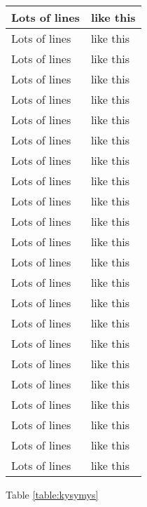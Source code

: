 \begin{longtable}[l]{| p{40mm} | p{105mm} |}
    \hline
    Lots of lines & like this\\
    \hline
    Lots of lines & like this\\
    \hline
    Lots of lines & like this\\
    \hline
    Lots of lines & like this\\
    \hline
    Lots of lines & like this\\
    \hline
    Lots of lines & like this\\
    \hline
    Lots of lines & like this\\
    \hline
    Lots of lines & like this\\
    \hline
    Lots of lines & like this\\
    \hline
    Lots of lines & like this\\
    \hline
    Lots of lines & like this\\
    \hline
    Lots of lines & like this\\
    \hline
    Lots of lines & like this\\
    \hline
    Lots of lines & like this\\
    \hline
    Lots of lines & like this\\
    \hline
    Lots of lines & like this\\
    \hline
    Lots of lines & like this\\
    \hline
    Lots of lines & like this\\
    \hline
    Lots of lines & like this\\
    \hline
    Lots of lines & like this\\
    \hline
    Lots of lines & like this\\
    \hline
    Lots of lines & like this\\
    \hline
    Lots of lines & like this\\
    \hline
\end{longtable}

Table \ref{table:kysymys}